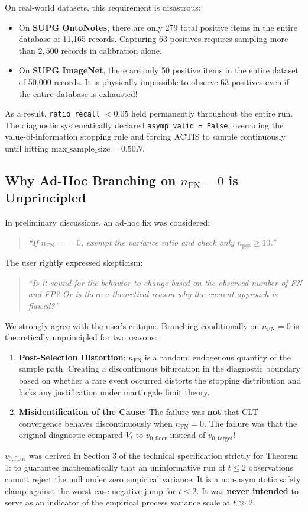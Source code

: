 \documentclass[11pt,a4paper]{article}
\begin{document}
On real-world datasets, this requirement is disastrous:
\begin{itemize}[leftmargin=*]
    \item On \textbf{SUPG OntoNotes}, there are only 279 total positive items in the entire database of 11,165 records. Capturing 63 positives requires sampling more than $2,500$ records in calibration alone.
    \item On \textbf{SUPG ImageNet}, there are only 50 positive items in the entire dataset of 50,000 records. It is physically impossible to observe 63 positives even if the entire database is exhausted!
\end{itemize}

As a result, \texttt{ratio\_recall} $< 0.05$ held permanently throughout the entire run. The diagnostic systematically declared \texttt{asymp\_valid = False}, overriding the value-of-information stopping rule and forcing ACTIS to sample continuously until hitting $\text{max\_sample\_size} = 0.50 N$.

\subsection{Why Ad-Hoc Branching on $n_{\text{FN}} = 0$ is Unprincipled}
In preliminary discussions, an ad-hoc fix was considered:
\begin{quote}
\emph{``If $n_{\text{FN}} == 0$, exempt the variance ratio and check only $n_{\text{pos}} \ge 10$.''}
\end{quote}
The user rightly expressed skepticism:
\begin{quote}
\emph{``Is it sound for the behavior to change based on the observed number of FN and FP? Or is there a theoretical reason why the current approach is flawed?''}
\end{quote}

We strongly agree with the user's critique. Branching conditionally on $n_{\text{FN}} = 0$ is theoretically unprincipled for two reasons:
\begin{enumerate}[leftmargin=*]
    \item \textbf{Post-Selection Distortion}: $n_{\text{FN}}$ is a random, endogenous quantity of the sample path. Creating a discontinuous bifurcation in the diagnostic boundary based on whether a rare event occurred distorts the stopping distribution and lacks any justification under martingale limit theory.
    \item \textbf{Misidentification of the Cause}: The failure was \textbf{not} that CLT convergence behaves discontinuously when $n_{\text{FN}} = 0$. The failure was that the original diagnostic compared $V_t$ to $v_{0, \text{floor}}$ instead of $v_{0, \text{target}}$! 
\end{enumerate}
$v_{0, \text{floor}}$ was derived in Section 3 of the technical specification strictly for Theorem 1: to guarantee mathematically that an uninformative run of $t \le 2$ observations cannot reject the null under zero empirical variance. It is a non-asymptotic safety clamp against the worst-case negative jump for $t \le 2$. It was \textbf{never intended} to serve as an indicator of the empirical process variance scale at $t \gg 2$.
\end{document}
